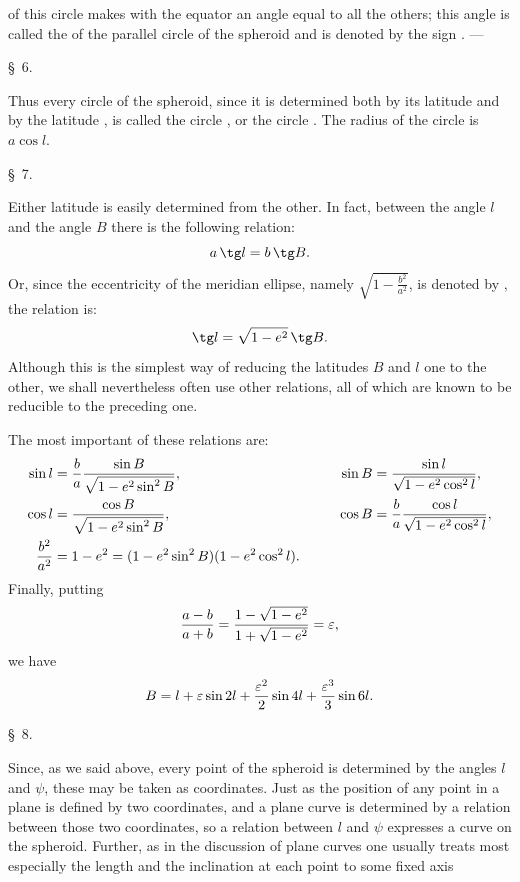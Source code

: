 of this circle makes with the equator an angle equal to all the others; this angle is called the  of the parallel circle of the spheroid and is denoted by the sign . ---

\begin{center}\S\ 6.\end{center}
Thus every circle of the spheroid, since it is determined both by its latitude  and by the latitude , is called the circle , or the circle . The radius of the circle  is $a\cos l$.

\begin{center}\S\ 7.\end{center}
Either latitude is easily determined from the other. In fact, between the angle $l$ and the angle $B$ there is the following relation:
\[
  a\,\tg l=b\,\tg B.
\]
Or, since the eccentricity of the meridian ellipse, namely $\sqrt{1-\frac{b^2}{a^2}}$, is denoted by , the relation is:
\[
  \tg l=\sqrt{1-e^2}\,\tg B.
\]
Although this is the simplest way of reducing the latitudes $B$ and $l$ one to the other, we shall nevertheless often use other relations, all of which are known to be reducible to the preceding one.

The most important of these relations are:
\[
\begin{aligned}
\sin l&={b\over a}{\sin B\over\sqrt{1-e^2\sin^2 B}},
&\qquad
\sin B&={\sin l\over\sqrt{1-e^2\cos^2 l}},\\
\cos l&={\cos B\over\sqrt{1-e^2\sin^2 B}},
&
\cos B&={b\over a}{\cos l\over\sqrt{1-e^2\cos^2 l}},\\
{b^2\over a^2}&=1-e^2=(1-e^2\sin^2 B)(1-e^2\cos^2 l).
\end{aligned}
\]
Finally, putting
\[
  {a-b\over a+b}={1-\sqrt{1-e^2}\over 1+\sqrt{1-e^2}}=\varepsilon,
\]
we have
\[
  B=l+\varepsilon\sin 2l+{\varepsilon^2\over 2}\sin 4l+{\varepsilon^3\over 3}\sin 6l.
\]

\begin{center}\S\ 8.\end{center}
Since, as we said above, every point of the spheroid is determined by the angles $l$ and $\psi$, these may be taken as coordinates. Just as the position of any point in a plane is defined by two coordinates, and a plane curve is determined by a relation between those two coordinates, so a relation between $l$ and $\psi$ expresses a curve on the spheroid. Further, as in the discussion of plane curves one usually treats most especially the length and the inclination at each point to some fixed axis
